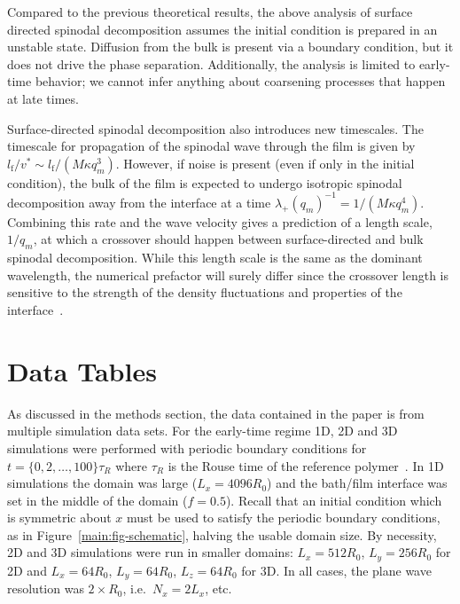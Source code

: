 \documentclass[journal=mamobx,manuscript=suppinfo]{achemso}
\newcommand{\txtf}{\mathrm{f}}
\begin{document}
Compared to the previous theoretical results, the above analysis of surface directed spinodal decomposition assumes the initial condition is prepared in an unstable state.
Diffusion from the bulk is present via a boundary condition, but it does not drive the phase separation.
Additionally, the analysis is limited to early-time behavior; we cannot infer anything about coarsening processes that happen at late times.

Surface-directed spinodal decomposition also introduces new timescales.
The timescale for propagation of the spinodal wave through the film is given by $l_{\txtf}/v^{*} \sim l_{\txtf}/(M \kappa q_{m}^{3})$.
However, if noise is present (even if only in the initial condition), the bulk of the film is expected to undergo isotropic spinodal decomposition away from the interface at a time $\lambda_{+}(q_{m})^{-1} = 1/(M \kappa q_{m}^{4})$.
Combining this rate and the wave velocity gives a prediction of a length scale, $1/q_{m}$, at which a crossover should happen between surface-directed and bulk spinodal decomposition.
While this length scale is the same as the dominant wavelength, the numerical prefactor will surely differ since the crossover length is sensitive to the strength of the density fluctuations and properties of the interface~\cite{Ball1990}.


\section{Data Tables} 

As discussed in the methods section, the data contained in the paper is from multiple simulation data sets.
For the early-time regime 1D, 2D and 3D simulations were performed with periodic boundary conditions for $t = \{0, 2, \ldots, 100\}\tau_{R}$ where $\tau_{R}$ is the Rouse time of the reference polymer~\cite{Tree2017}.
In 1D simulations the domain was large ($L_{x} = 4096 R_{0}$) and the bath/film interface was set in the middle of the domain ($f = 0.5$).
Recall that an initial condition which is symmetric about $x$ must be used to satisfy the periodic boundary conditions, as in Figure~\ref{main:fig-schematic}, halving the usable domain size.
By necessity, 2D and 3D simulations were run in smaller domains: $L_{x} = 512 R_{0}$, $L_{y} = 256 R_{0}$ for 2D and $L_{x} = 64 R_{0}$, $L_{y} = 64 R_{0}$, $L_{z} = 64 R_{0}$ for 3D.
In all cases, the plane wave resolution was $2\times R_{0}$, i.e.\ $N_{x} = 2 L_{x}$, etc.
\end{document}
